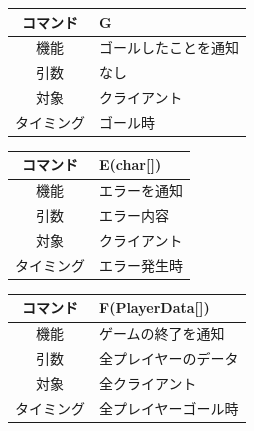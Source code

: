 \documentclass{jarticle}
\begin{document}
\begin{enumerate}
\begin{table}[h]
\begin{center}
\begin{tabular}{|c||p{30em}|}
            \end{tabular}
        \end{center}
    \end{table}
    \begin{table}[h]
        \label{table:command1-2}
        \begin{center}
            \begin{tabular}{|c||p{30em}|}\hline
                コマンド&G\\\hline
                機能&ゴールしたことを通知\\
                引数&なし\\
                対象&クライアント\\
                タイミング&ゴール時\\\hline
            \end{tabular}
        \end{center}
    \end{table}
    \begin{table}[h]
        \label{table:command1-2}
        \begin{center}
            \begin{tabular}{|c||p{30em}|}\hline
                コマンド&E(char[])\\\hline
                機能&エラーを通知\\
                引数&エラー内容\\
                対象&クライアント\\
                タイミング&エラー発生時\\\hline
            \end{tabular}
        \end{center}
    \end{table}
    \begin{table}[h]
        \label{table:command1-2}
        \begin{center}
            \begin{tabular}{|c||p{30em}|}\hline
                コマンド&F(PlayerData[])\\\hline
                機能&ゲームの終了を通知\\
                引数&全プレイヤーのデータ\\
                対象&全クライアント\\
                タイミング&全プレイヤーゴール時\\\hline
            \end{tabular}
        \end{center}

\end{table}
\end{enumerate}
\end{document}
